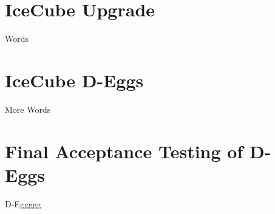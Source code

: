 \documentclass[main.tex]{subfiles}
\begin{document}
\section{IceCube Upgrade}

Words

\section{IceCube D-Eggs}

More Words

\section{Final Acceptance Testing of D-Eggs}

D-Eggggg
\end{document}

